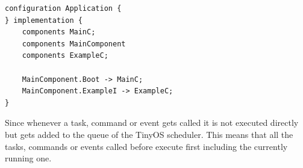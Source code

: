 \begin{lstlisting}
configuration Application {
} implementation {
	components MainC;
	components MainComponent
	components ExampleC;
		
	MainComponent.Boot -> MainC;
	MainComponent.ExampleI -> ExampleC;
}
\end{lstlisting} 

Since whenever a task, command or event gets called it is not executed directly but gets added to the queue of the TinyOS scheduler. This means that all the tasks, commands or events called before execute first including the currently running one. 